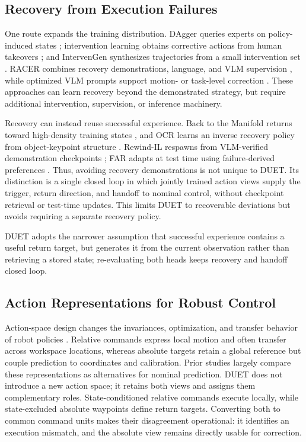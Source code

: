 \documentclass[letterpaper, 10 pt, conference]{ieeeconf}
\begin{document}
\subsection{Recovery from Execution Failures}
One route expands the training distribution. DAgger queries experts on policy-induced states \cite{dagger}; intervention learning obtains corrective actions from human takeovers \cite{eil,sirius}; and IntervenGen synthesizes trajectories from a small intervention set \cite{intervengen}. RACER combines recovery demonstrations, language, and VLM supervision \cite{racer}, while optimized VLM prompts support motion- or task-level correction \cite{vlmrecovery}. These approaches can learn recovery beyond the demonstrated strategy, but require additional intervention, supervision, or inference machinery.

Recovery can instead reuse successful experience. Back to the Manifold returns toward high-density training states \cite{backtomanifold}, and OCR learns an inverse recovery policy from object-keypoint structure \cite{ocr}. Rewind-IL respawns from VLM-verified demonstration checkpoints \cite{rewindil}; FAR adapts at test time using failure-derived preferences \cite{far}. Thus, avoiding recovery demonstrations is not unique to DUET. Its distinction is a single closed loop in which jointly trained action views supply the trigger, return direction, and handoff to nominal control, without checkpoint retrieval or test-time updates. This limits DUET to recoverable deviations but avoids requiring a separate recovery policy.

DUET adopts the narrower assumption that successful experience contains a useful return target, but generates it from the current observation rather than retrieving a stored state; re-evaluating both heads keeps recovery and handoff closed loop.

\subsection{Action Representations for Robust Control}
Action-space design changes the invariances, optimization, and transfer behavior of robot policies \cite{aljalbout2024actionspace,feng2026demystifying}. Relative commands express local motion and often transfer across workspace locations, whereas absolute targets retain a global reference but couple prediction to coordinates and calibration. Prior studies largely compare these representations as alternatives for nominal prediction. DUET does not introduce a new action space; it retains both views and assigns them complementary roles. State-conditioned relative commands execute locally, while state-excluded absolute waypoints define return targets. Converting both to common command units makes their disagreement operational: it identifies an execution mismatch, and the absolute view remains directly usable for correction.
\end{document}
